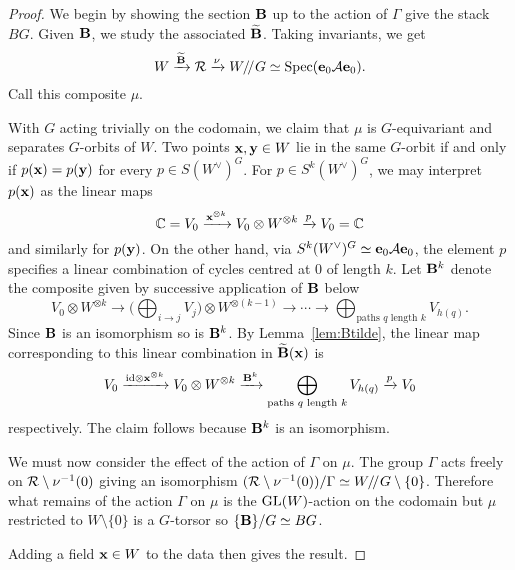 \documentclass{amsart}
\theoremstyle{definition}
\begin{document}
\begin{proof}
We begin by showing the section $\mathbf{B}$ up to the action of $\Gamma$ give the stack $BG$.
Given $\mathbf{B}$, we study the associated $\widetilde{\mathbf{B}}$.
Taking invariants, we get 
$$W \xrightarrow{\widetilde{\mathbf{B}}} \mathcal{R} \xrightarrow{\nu} W / \! /_{} G \simeq \operatorname{Spec}(\mathbf{e}_0 \mathcal{A} \mathbf{e}_0).$$
Call this composite $\mu$.

With $G$ acting trivially on the codomain, we claim that $\mu$ is $G$-equivariant and separates $G$-orbits of $W$.
Two points $\mathbf{x}, \mathbf{y} \in W$ lie in the same $G$-orbit if and only if $p(\mathbf{x})=p(\mathbf{y})$ for every $p \in S(W^\vee)^G$.
For $p \in S^k(W^\vee)^G$, we may interpret $p(\mathbf{x})$ as the linear maps $$\mathbb{C} = V_0 \xrightarrow{\mathbf{x}^{\otimes k}} V_0 \otimes W^{\otimes k} \xrightarrow{p} V_0=\mathbb{C}$$ and similarly for $p(\mathbf{y})$.
On the other hand, via $S^k(W^\vee)^G \simeq \mathbf{e}_0 \mathcal{A} \mathbf{e}_0$, the element $p$ specifies a linear combination of cycles centred at 0 of length $k$.
Let $\mathbf{B}^k$ denote the composite given by successive application of $\mathbf{B}$ below $$V_0 \otimes W^{\otimes k} \longrightarrow \Bigg(\bigoplus_{i \rightarrow j} V_j\Bigg) \otimes W^{\otimes (k-1)} \rightarrow \cdots \rightarrow \bigoplus_{\text{paths } q \text{ length } k} V_{h(q)}.$$
Since $\mathbf{B}$ is an isomorphism so is $\mathbf{B}^k$.
By Lemma~\ref{lem:Btilde}, the linear map corresponding to this linear combination in $\widetilde{\mathbf{B}}(\mathbf{x})$ is $$V_0 \xrightarrow{\text{id} \otimes \mathbf{x}^{\otimes k}} V_0 \otimes W^{\otimes k} \xrightarrow{\mathbf{B}^k} \bigoplus_{\text{paths } q \text{ length } k} V_{h(q)} \xrightarrow{p} V_0$$
respectively.
The claim follows because $\mathbf{B}^k$ is an isomorphism.

We must now consider the effect of the action of $\Gamma$ on $\mu$.
The group $\Gamma$ acts freely on $\mathcal{R}\setminus \nu^{-1}(0)$ giving an isomorphism $(\mathcal{R}\setminus \nu^{-1}(0)) / \Gamma \simeq W / \! /_{} G \setminus\{0\}$.
Therefore what remains of the action $\Gamma$ on $\mu$ is the $\operatorname{GL}(W)$-action on the codomain but $\mu$ restricted to $W\setminus \{0\}$ is a $G$-torsor so $\{\mathbf{B}\}/G \simeq BG$.

Adding a field $\mathbf{x} \in W$ to the data then gives the result.
\end{proof}

\end{document}

